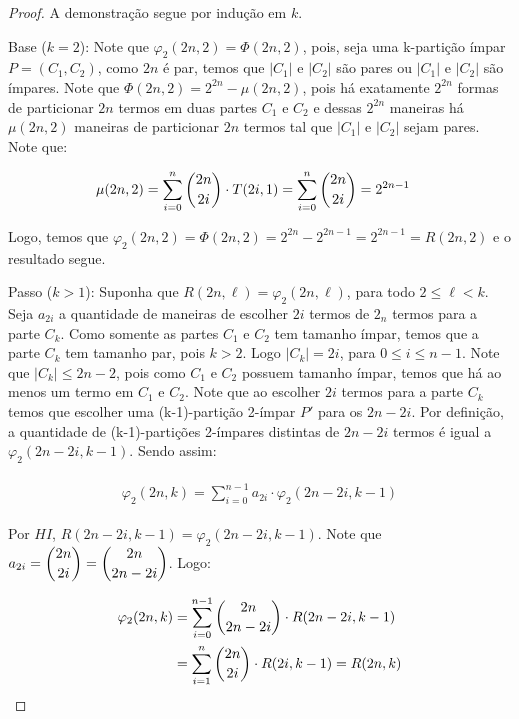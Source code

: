 \documentclass[12pt]{article}
\begin{document}
  \begin{proof}
  	A demonstração segue por indução em $k$.
  	
  	Base ($k = 2$): Note que $\varphi_2(2n, 2) = \Phi(2n, 2)$, pois, seja uma k-partição ímpar $P=(C_1, C_2)$, como $2n$ é par, temos que $|C_1| \text{ e } |C_2|$ são pares ou $|C_1| \text{ e } |C_2|$ são ímpares. Note que $\Phi(2n, 2) = 2^{2n} - \mu(2n, 2)$, pois há exatamente $2^{2n}$ formas de particionar $2n$ termos em duas partes $C_1$ e $C_2$ e dessas $2^{2n}$ maneiras há $\mu(2n, 2)$ maneiras de particionar $2n$ termos tal que $|C_1|$ e $|C_2|$ sejam pares. Note que:  
  	
  	\begin{align}
  		\begin{split}
  			\mu(2n, 2) &= \sum\limits_{i = 0}^{n}\escolhe{2n}{2i} \cdot T(2i, 1) = \sum\limits_{i = 0}^{n}\escolhe{2n}{2i} = 2^{2n-1}
  		\end{split} 
  	\end{align} 
  	
  	Logo, temos que $\varphi_2(2n, 2) = \Phi(2n, 2) = 2^{2n} - 2^{2n - 1} = 2^{2n - 1} = R(2n, 2)$ e o resultado segue. \newl
  	
  	
  	Passo ($k > 1$): Suponha que $R(2n, \ell) = \varphi_2(2n, \ell)$, para todo $2 \leq \ell < k$. Seja $a_{2i}$ a quantidade de maneiras de escolher $2i$ termos de $2_n$ termos para a parte $C_k$. Como somente as partes $C_1$ e $C_2$ tem tamanho ímpar, temos que a parte $C_k$ tem tamanho par, pois $k > 2$. Logo $|C_k| = 2i$, para $0 \leq i \leq n - 1$. Note que $|C_k| \leq 2n - 2$, pois como $C_1$ e $C_2$ possuem tamanho ímpar, temos que há ao menos um termo em $C_1$ e $C_2$. Note que ao escolher $2i$ termos para a parte $C_k$ temos que escolher uma (k-1)-partição 2-ímpar $P'$ para os $2n - 2i$. Por definição, a quantidade de (k-1)-partições 2-ímpares distintas de $2n - 2i$ termos é igual a $\varphi_2(2n - 2i, k-1)$. Sendo assim: 
  	
  	\begin{align}
  		\begin{split}
  			\varphi_2(2n, k) = \sum\limits_{i = 0}^{n - 1}a_{2i} \cdot \varphi_2(2n - 2i, k-1)
  		\end{split} 
  	\end{align} 
  	
  	Por $HI$, $R(2n - 2i, k-1) = \varphi_2(2n - 2i, k-1)$. Note que $a_{2i} = \escolhe{2n}{2i} = \escolhe{2n}{2n - 2i} $. Logo:
  	
  	\begin{align}
  		\begin{split}
  			\varphi_2(2n, k) &= \sum\limits_{i = 0}^{n-1}\escolhe{2n}{2n - 2i} \cdot R(2n - 2i, k-1)\\
  			&= \sum\limits_{i = 1}^{n}\escolhe{2n}{2i} \cdot R(2i, k-1) = R(2n, k)
  		\end{split} 
  	\end{align}  
  	
  	\end{proof} \newl
  
\end{document}
